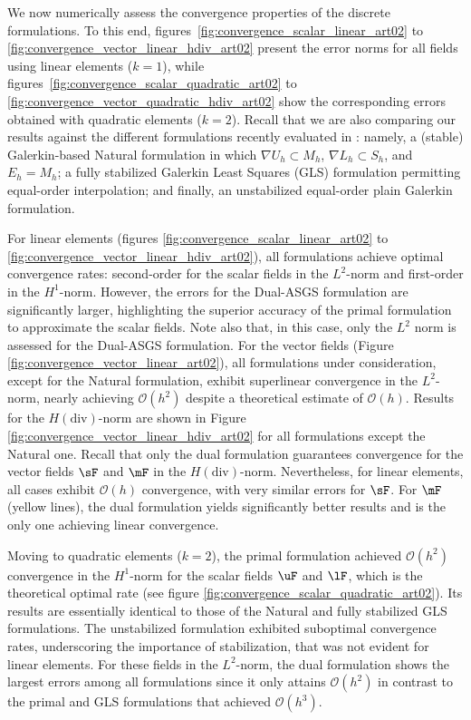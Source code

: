 We now numerically assess the convergence properties of the discrete formulations. To this end, figures~\ref{fig:convergence_scalar_linear_art02} to \ref{fig:convergence_vector_linear_hdiv_art02} present the error norms for all fields using linear elements ($k=1$), while figures~\ref{fig:convergence_scalar_quadratic_art02} to \ref{fig:convergence_vector_quadratic_hdiv_art02} show the corresponding errors obtained with quadratic elements ($k=2$). Recall that we are also comparing our results against the different formulations recently evaluated in \cite{ddcm1_article_gus}: namely, a (stable) Galerkin-based Natural formulation in which $\nabla{U}_h \subset M_h$, $\nabla{L}_h \subset S_h$, and $E_h = M_h$; a fully stabilized Galerkin Least Squares (GLS) formulation permitting equal-order interpolation; and finally, an unstabilized equal-order plain Galerkin formulation.

For linear elements (figures \ref{fig:convergence_scalar_linear_art02} to \ref{fig:convergence_vector_linear_hdiv_art02}), all formulations achieve optimal convergence rates: second-order for the scalar fields in the $L^2$-norm and first-order in the $H^1$-norm. However, the errors for the Dual-ASGS formulation are significantly larger, highlighting the superior accuracy of the primal formulation to approximate the scalar fields.
Note also that, in this case, only the $L^2$ norm is assessed for the Dual-ASGS formulation. For the vector fields (Figure \ref{fig:convergence_vector_linear_art02}), all formulations under consideration, except for the Natural formulation, exhibit superlinear convergence in the $L^2$-norm, nearly achieving $\mathcal{O}(h^2)$ despite a theoretical estimate of $\mathcal{O}(h)$.
Results for the $H(\text{div})$-norm are shown in Figure \ref{fig:convergence_vector_linear_hdiv_art02} for all formulations except the Natural one. Recall that only the dual formulation guarantees convergence for the vector fields $\sF$ and $\mF$ in the $H(\text{div})$-norm. Nevertheless, for linear elements, all cases exhibit $\mathcal{O}(h)$ convergence, with very similar errors for $\sF$. For $\mF$ (yellow lines), the dual formulation yields significantly better results and is the only one achieving linear convergence.

Moving to quadratic elements ($k=2$), the primal formulation achieved $\mathcal{O}(h^2)$ convergence in the $H^1$-norm for the scalar fields $\uF$ and $\lF$, which is the theoretical optimal rate (see figure \ref{fig:convergence_scalar_quadratic_art02}). Its results are essentially identical to those of the Natural and fully stabilized GLS formulations. The unstabilized formulation exhibited suboptimal convergence rates, underscoring the importance of stabilization, that was not evident for linear elements. For these fields in the $L^2$-norm, the dual formulation shows the largest errors among all formulations since it only attains $\mathcal{O}(h^2)$ in contrast to
the primal and GLS formulations that achieved $\mathcal{O}(h^3)$.

